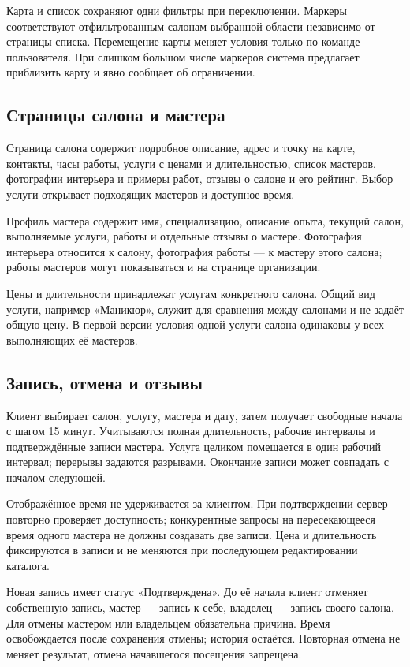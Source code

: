 Карта и список сохраняют одни фильтры при переключении. Маркеры соответствуют отфильтрованным салонам выбранной области независимо от страницы списка. Перемещение карты меняет условия только по команде пользователя. При слишком большом числе маркеров система предлагает приблизить карту и явно сообщает об ограничении.

\subsection{Страницы салона и мастера}
Страница салона содержит подробное описание, адрес и точку на карте, контакты, часы работы, услуги с ценами и длительностью, список мастеров, фотографии интерьера и примеры работ, отзывы о салоне и его рейтинг. Выбор услуги открывает подходящих мастеров и доступное время.

Профиль мастера содержит имя, специализацию, описание опыта, текущий салон, выполняемые услуги, работы и отдельные отзывы о мастере. Фотография интерьера относится к салону, фотография работы --- к мастеру этого салона; работы мастеров могут показываться и на странице организации.

Цены и длительности принадлежат услугам конкретного салона. Общий вид услуги, например «Маникюр», служит для сравнения между салонами и не задаёт общую цену. В первой версии условия одной услуги салона одинаковы у всех выполняющих её мастеров.

\subsection{Запись, отмена и отзывы}
Клиент выбирает салон, услугу, мастера и дату, затем получает свободные начала с шагом 15 минут. Учитываются полная длительность, рабочие интервалы и подтверждённые записи мастера. Услуга целиком помещается в один рабочий интервал; перерывы задаются разрывами. Окончание записи может совпадать с началом следующей.

Отображённое время не удерживается за клиентом. При подтверждении сервер повторно проверяет доступность; конкурентные запросы на пересекающееся время одного мастера не должны создавать две записи. Цена и длительность фиксируются в записи и не меняются при последующем редактировании каталога.

Новая запись имеет статус «Подтверждена». До её начала клиент отменяет собственную запись, мастер --- запись к себе, владелец --- запись своего салона. Для отмены мастером или владельцем обязательна причина. Время освобождается после сохранения отмены; история остаётся. Повторная отмена не меняет результат, отмена начавшегося посещения запрещена.

